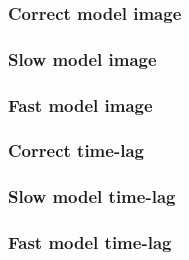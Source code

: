\begin{frame} \frametitle{Correct model image}  \end{frame}
\begin{frame} \frametitle{Slow model image   }  \end{frame}
\begin{frame} \frametitle{Fast model image   }  \end{frame}

\begin{frame} \frametitle{Correct time-lag   }  \end{frame}
\begin{frame} \frametitle{Slow model time-lag}  \end{frame}
\begin{frame} \frametitle{Fast model time-lag}  \end{frame}



